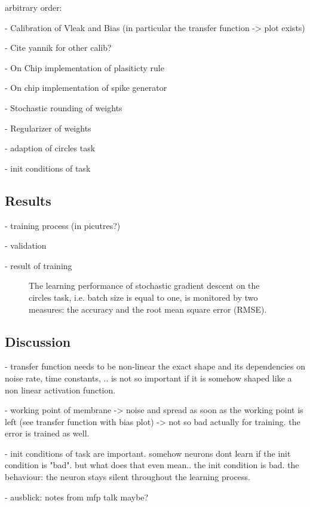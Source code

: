 arbitrary order:

- Calibration of Vleak and Bias (in particular the transfer function -> plot exists)

- Cite yannik for other calib?

- On Chip implementation of plasiticty rule

- On chip implementation of spike generator

- Stochastic rounding of weights

- Regularizer of weights

- adaption of circles task 

- init conditions of task


\subsection{Results}

- training process (in picutres?)

- validation

- result of training

\begin{figure}
	\label{circles_acc}
	\begin{center}
		
	\end{center}
	\caption{The learning performance of stochastic gradient descent on the circles task, i.e. batch size is equal to one, is monitored by two measures: the accuracy and the root mean square error (RMSE).}
\end{figure}
\subsection{Discussion}

- transfer function needs to be non-linear the exact shape and its dependencies on noise rate, time constants, .. is not so important if it is somehow shaped like a non linear activation function.

- working point of membrane -> noise and spread as soon as the working point is left (see transfer function with bias plot) -> not so bad actually for training. the error is trained as well. 

- init conditions of task are important. somehow neurons dont learn if the init condition is "bad". but what does that even  mean.. the init condition is bad. the behaviour: the neuron stays silent throughout the learning process. 

- ausblick: notes from mfp talk maybe?